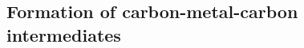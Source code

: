 \documentclass[%
 reprint,
 amsmath,amssymb,
 aps,
prb,
floatfix,
]{revtex4-2}
\newcommand{\zhzh}{\color{blue}}
\newcommand{\zhzh}{\color{blue}}
\begin{document}
{%

}


\ifdefined\INTERAL
\subsection{Formation of carbon-metal-carbon intermediates}
\fi
\end{document}
